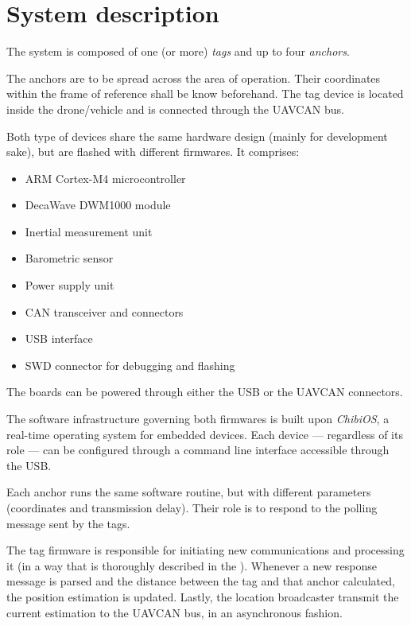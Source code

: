 \section{System description}

The system is composed of one (or more) \emph{tags} and up to four \emph{anchors}.

The anchors are to be spread across the area of operation.
Their coordinates within the frame of reference shall be know beforehand.
The tag device is located inside the drone/vehicle and is connected through the UAVCAN bus.

Both type of devices share the same hardware design (mainly for development sake), but are flashed with different firmwares.
It comprises:
\begin{itemize}
\item ARM Cortex-M4 microcontroller
\item DecaWave DWM1000 module
\item Inertial measurement unit
\item Barometric sensor
\item Power supply unit
\item CAN transceiver and connectors
\item USB interface
\item SWD connector for debugging and flashing
\end{itemize}
The boards can be powered through either the USB or the UAVCAN connectors.

The software infrastructure governing both firmwares is built upon \emph{ChibiOS}, a real-time operating system for embedded devices.
Each device --- regardless of its role --- can be configured through a command line interface accessible through the USB.

Each anchor runs the same software routine, but with different parameters (coordinates and transmission delay).
Their role is to respond to the polling message sent by the tags.

The tag firmware is responsible for initiating new communications and processing it (in a way that is thoroughly described in the ).
Whenever a new response message is parsed and the distance between the tag and that anchor calculated, the position estimation is updated.
Lastly, the location broadcaster transmit the current estimation to the UAVCAN bus, in an asynchronous fashion.
